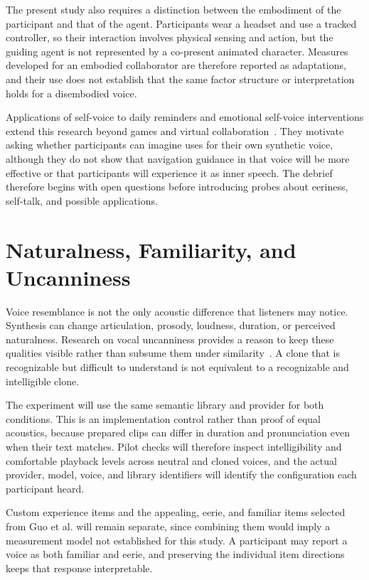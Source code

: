 The present study also requires a distinction between the embodiment of the participant and that of the agent. Participants wear a headset and use a tracked controller, so their interaction involves physical sensing and action, but the guiding agent is not represented by a co-present animated character. Measures developed for an embodied collaborator are therefore reported as adaptations, and their use does not establish that the same factor structure or interpretation holds for a disembodied voice.

Applications of self-voice to daily reminders and emotional self-voice interventions extend this research beyond games and virtual collaboration~\cite{kim2024selfvoice,fang2025emotional}. They motivate asking whether participants can imagine uses for their own synthetic voice, although they do not show that navigation guidance in that voice will be more effective or that participants will experience it as inner speech. The debrief therefore begins with open questions before introducing probes about eeriness, self-talk, and possible applications.

\section{Naturalness, Familiarity, and Uncanniness}
Voice resemblance is not the only acoustic difference that listeners may notice. Synthesis can change articulation, prosody, loudness, duration, or perceived naturalness. Research on vocal uncanniness provides a reason to keep these qualities visible rather than subsume them under similarity~\cite{diel2024uncanny}. A clone that is recognizable but difficult to understand is not equivalent to a recognizable and intelligible clone.

The experiment will use the same semantic library and provider for both conditions. This is an implementation control rather than proof of equal acoustics, because prepared clips can differ in duration and pronunciation even when their text matches. Pilot checks will therefore inspect intelligibility and comfortable playback levels across neutral and cloned voices, and the actual provider, model, voice, and library identifiers will identify the configuration each participant heard.

Custom experience items and the appealing, eerie, and familiar items selected from Guo et al. will remain separate, since combining them would imply a measurement model not established for this study. A participant may report a voice as both familiar and eerie, and preserving the individual item directions keeps that response interpretable.

